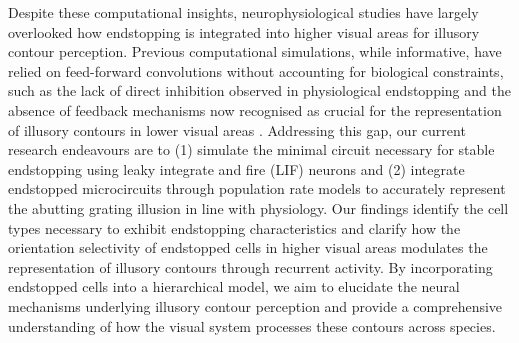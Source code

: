 \documentclass[12pt]{article}
\begin{document}
\bigbreak
Despite these computational insights, neurophysiological studies have largely overlooked how endstopping is integrated into higher visual areas for illusory contour perception. Previous computational simulations, while informative, have relied on feed-forward convolutions without accounting for biological constraints, such as the lack of direct inhibition observed in physiological endstopping \autocite{sillitoContributionExcitatoryInhibitory1977} and the absence of feedback mechanisms now recognised as crucial for the representation of illusory contours in lower visual areas \autocite{pakTopDownFeedbackControls2020}. Addressing this gap, our current research endeavours are to (1) simulate the minimal circuit necessary for stable endstopping using leaky integrate and fire (LIF) neurons and (2) integrate endstopped microcircuits through population rate models to accurately represent the abutting grating illusion in line with physiology. Our findings identify the cell types necessary to exhibit endstopping characteristics and clarify how the orientation selectivity of endstopped cells in higher visual areas modulates the representation of illusory contours through recurrent activity. By incorporating endstopped cells into a hierarchical model, we aim to elucidate the neural mechanisms underlying illusory contour perception and provide a comprehensive understanding of how the visual system processes these contours across species.

\newpage
\end{document}
